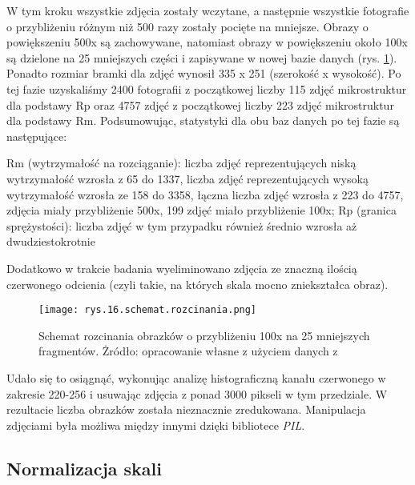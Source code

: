 W tym kroku wszystkie zdjęcia zostały wczytane, a następnie wszystkie fotografie o przybliżeniu różnym niż 500 razy zostały pocięte na mniejsze. Obrazy o powiększeniu 500x są zachowywane, natomiast obrazy w powiększeniu około 100x są dzielone na 25 mniejszych części i zapisywane w nowej bazie danych (rys. \ref{fig:mesh16}). Ponadto rozmiar bramki dla zdjęć wynosił 335 x 251 (szerokość x  wysokość). Po tej fazie uzyskaliśmy 2400 fotografii z początkowej liczby 115 zdjęć mikrostruktur dla podstawy Rp oraz 4757 zdjęć z początkowej liczby 223 zdjęć mikrostruktur dla podstawy Rm. Podsumowując, statystyki dla obu baz danych po tej fazie są następujące:
\begin{outline}
	\1 Rm (wytrzymałość na rozciąganie):
		\2 liczba zdjęć reprezentujących niską wytrzymałość wzrosła z 65 do 1337,
		\2 liczba zdjęć reprezentujących wysoką wytrzymałość wzrosła ze 158 do 3358,
		\2 łączna liczba zdjęć wzrosła z 223 do 4757,
		 zdjęcia miały przybliżenie 500x, 199 zdjęć miało przybliżenie 100x;
	\1 Rp (granica sprężystości):
		\2 liczba zdjęć w tym przypadku również średnio wzrosła aż dwudziestokrotnie
\end{outline}
Dodatkowo w trakcie badania wyeliminowano zdjęcia ze znaczną ilością czerwonego odcienia (czyli takie, na których skala mocno zniekształca obraz).
\begin{figure}[h]
    \centering
    \texttt{[image: rys.16.schemat.rozcinania.png]}
    \caption{Schemat rozcinania obrazków o przybliżeniu 100x na 25 mniejszych fragmentów. Żródło: opracowanie własne z użyciem danych z \cite{Pirowski17}}
    \label{fig:mesh16}
\end{figure}
Udało się to osiągnąć, wykonując analizę histograficzną kanału czerwonego w zakresie 220-256 i usuwając zdjęcia z ponad 3000 pikseli w tym przedziale. W rezultacie liczba obrazków została nieznacznie zredukowana. Manipulacja zdjęciami była możliwa między innymi dzięki bibliotece \textit{PIL}.


\subsection{Normalizacja skali}
\label{sec:normalizacja_skali}

